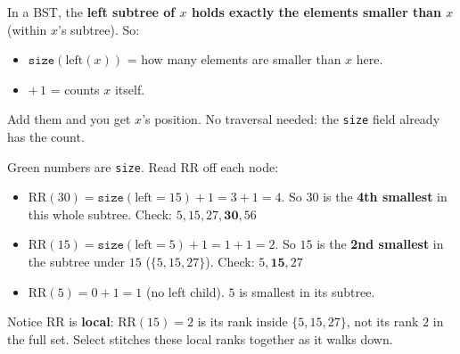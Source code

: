 \documentclass[11pt]{article}
\begin{document}
\begin{keybox}
In a BST, the \textbf{left subtree of $x$ holds exactly the elements smaller than $x$} (within $x$'s subtree). So:
\begin{itemize}[leftmargin=1.4em,itemsep=1pt]
  \item $\texttt{size}(\text{left}(x))$ = how many elements are smaller than $x$ here.
  \item $+\,1$ = counts $x$ itself.
\end{itemize}
Add them and you get $x$'s position. No traversal needed: the \texttt{size} field already has the count.
\end{keybox}

\begin{examplebox}
\begin{center}
\end{center}
Green numbers are \texttt{size}. Read RR off each node:
\begin{itemize}[leftmargin=1.4em,itemsep=1pt]
  \item $\text{RR}(30) = \texttt{size}(\text{left}{=}15) + 1 = 3 + 1 = 4$. So $30$ is the \textbf{4th smallest} in this whole subtree. Check: $5,15,27,\mathbf{30},56$ \checkmark
  \item $\text{RR}(15) = \texttt{size}(\text{left}{=}5) + 1 = 1 + 1 = 2$. So $15$ is the \textbf{2nd smallest} in the subtree under $15$ ($\{5,15,27\}$). Check: $5,\mathbf{15},27$ \checkmark
  \item $\text{RR}(5) = 0 + 1 = 1$ (no left child). $5$ is smallest in its subtree. \checkmark
\end{itemize}
Notice RR is \textbf{local}: $\text{RR}(15)=2$ is its rank inside $\{5,15,27\}$, not its rank $2$ in the full set. Select stitches these local ranks together as it walks down.
\end{examplebox}
\end{document}
